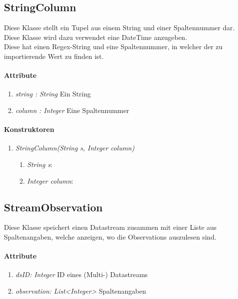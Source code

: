 \subsection{StringColumn}
Diese Klasse stellt ein Tupel aus einem String und einer Spaltennummer dar.
Diese Klasse wird dazu verwendet eine DateTime anzugeben. \\Diese hat einen Regex-String und eine Spaltennummer, in welcher der zu importierende Wert zu finden ist.
\paragraph{Attribute}
\begin{enumerate}[-]
	\item \textit{string : String} Ein String
	\item \textit{column : Integer} Eine Spaltennummer
\end{enumerate} 

\paragraph{Konstruktoren}
\begin{enumerate}[+]
	\item \textit{StringColumn(String s, Integer column)} \\
	
	\begin{enumerate}[$\bullet$]
		\item \textit{String s}: 
		\item \textit{Integer column}:
	\end{enumerate}
\end{enumerate}







\subsection{StreamObservation}
Diese Klasse speichert einen Datastream zusammen mit einer Liste aus Spaltenangaben, welche anzeigen, wo die Observations auszulesen sind.
\paragraph{Attribute} 
\begin{enumerate}[-]
	\item \textit{dsID: Integer} ID eines (Multi-) Datastreams
	\item \textit{observation: List<Integer>} Spaltenangaben
\end{enumerate}

